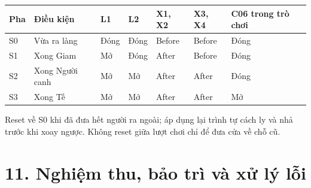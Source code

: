 \documentclass[
  11pt,
  a4paper,
]{article}
\newcounter{none} %
\begin{document}
{\def\LTcaptype{none} %
\begin{longtable}[]{@{}
  >{\raggedright\arraybackslash}p{}
  >{\raggedright\arraybackslash}p{}
  >{\raggedright\arraybackslash}p{}
  >{\raggedright\arraybackslash}p{}
  >{\raggedright\arraybackslash}p{}
  >{\raggedright\arraybackslash}p{}
  >{\raggedright\arraybackslash}p{}@{}}
\toprule\noalign{}
\begin{minipage}[b]{\linewidth}\raggedright
Pha
\end{minipage} & \begin{minipage}[b]{\linewidth}\raggedright
Điều kiện
\end{minipage} & \begin{minipage}[b]{\linewidth}\raggedright
L1
\end{minipage} & \begin{minipage}[b]{\linewidth}\raggedright
L2
\end{minipage} & \begin{minipage}[b]{\linewidth}\raggedright
X1, X2
\end{minipage} & \begin{minipage}[b]{\linewidth}\raggedright
X3, X4
\end{minipage} & \begin{minipage}[b]{\linewidth}\raggedright
C06 trong trò chơi
\end{minipage} \\
\midrule\noalign{}
\endhead
\bottomrule\noalign{}
\endlastfoot
S0 & Vừa ra làng & Đóng & Đóng & Before & Before & Đóng \\
S1 & Xong Giam & Mở & Đóng & After & Before & Đóng \\
S2 & Xong Người canh & Mở & Mở & After & After & Đóng \\
S3 & Xong Tế & Mở & Mở & After & After & Mở \\
\end{longtable}
}

Reset về S0 khi đã đưa hết người ra ngoài; áp dụng lại trình tự cách ly
và nhả trước khi xoay ngược. Không reset giữa lượt chơi chỉ để đưa cửa
về chỗ cũ.

\section{11. Nghiệm thu, bảo trì và xử lý
lỗi}\label{nghiux1ec7m-thu-bux1ea3o-truxec-vuxe0-xux1eed-luxfd-lux1ed7i}
\end{document}
